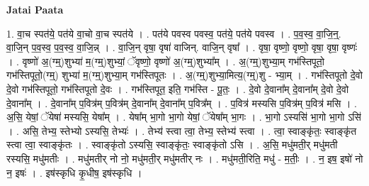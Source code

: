 \documentclass[17pt]{extarticle}
\begin{document}
\textbf{Jatai Paata} \newline

1. वा॒च स्पत॑ये॒ पत॑ये वा॒चो वा॒च स्पत॑ये । . पत॑ये पवस्व पवस्व॒ पत॑ये॒ पत॑ये पवस्व । . प॒व॒स्व॒ वा॒जि॒न्॒. वा॒जि॒न् प॒व॒स्व॒ प॒व॒स्व॒ वा॒जि॒न्न् । . वा॒जि॒न् वृषा॒ वृषा॑ वाजिन्. वाजि॒न् वृषा᳚ । . वृषा॒ वृष्णो॒ वृष्णो॒ वृषा॒ वृषा॒ वृष्णः॑ । . वृष्णो॑ अ॒(ग्म्॒)शुभ्या॑ म॒(ग्म्॒)शुभ्यां॒ ॅवृष्णो॒ वृष्णो॑ अ॒(ग्म्॒)शुभ्या᳚म् । . अ॒(ग्म्॒)शुभ्या॒म् गभ॑स्तिपूतो॒ गभ॑स्तिपूतो॒(ग्म्॒) शुभ्या॑ म॒(ग्म्॒)शुभ्या॒म् गभ॑स्तिपूतः । . अ॒(ग्म्॒)शुभ्या॒मित्य॒(ग्म्॒)शु - भ्या॒म् । . गभ॑स्तिपूतो दे॒वो दे॒वो गभ॑स्तिपूतो॒ गभ॑स्तिपूतो दे॒वः । . गभ॑स्तिपूत॒ इति॒ गभ॑स्ति - पू॒तः॒ । . दे॒वो दे॒वाना᳚म् दे॒वाना᳚म् दे॒वो दे॒वो दे॒वाना᳚म् । . दे॒वाना᳚म् प॒वित्र॑म् प॒वित्र॑म् दे॒वाना᳚म् दे॒वाना᳚म् प॒वित्र᳚म् । . प॒वित्र॑ मस्यसि प॒वित्र॑म् प॒वित्र॑ मसि । . अ॒सि॒ येषां॒ ॅयेषा॑ मस्यसि॒ येषा᳚म् । . येषा᳚म् भा॒गो भा॒गो येषां॒ ॅयेषा᳚म् भा॒गः । . भा॒गो ऽस्यसि॑ भा॒गो भा॒गो ऽसि॑ । . असि॒ तेभ्य॒ स्तेभ्यो ऽस्यसि॒ तेभ्यः॑ । . तेभ्य॑ स्त्वा त्वा॒ तेभ्य॒ स्तेभ्य॑ स्त्वा । . त्वा॒ स्वाङ्कृ॑तः॒ स्वाङ्कृ॑त स्त्वा त्वा॒ स्वाङ्कृ॑तः । . स्वाङ्कृ॑तो ऽस्यसि॒ स्वाङ्कृ॑तः॒ स्वाङ्कृ॑तो ऽसि । . अ॒सि॒ मधु॑मती॒र् मधु॑मती रस्यसि॒ मधु॑मतीः । . मधु॑मतीर् नो नो॒ मधु॑मती॒र् मधु॑मतीर् नः । . मधु॑मती॒रिति॒ मधु॑ - म॒तीः॒ । . न॒ इष॒ इषो॑ नो न॒ इषः॑ । . इष॑स्कृधि कृ॒धीष॒ इष॑स्कृधि । \newline
\end{document}
